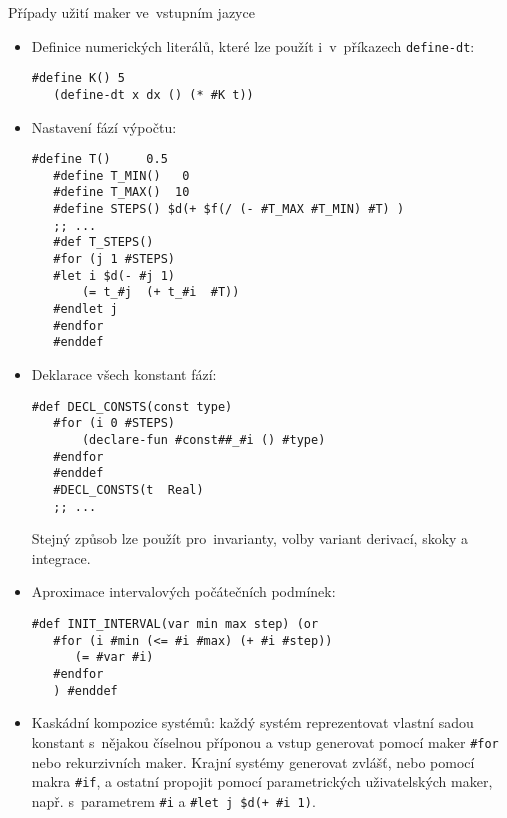 \documentclass[thesis=M,czech]{FITthesis}[2012/06/26]
\newcommand{\id}[1]{\texttt{#1}}
\begin{document}
\begin{section}{Případy užití maker ve~vstupním jazyce}
\label{s:macros:use_cases}
\begin{itemize}
\item Definice numerických literálů,
   které lze použít i~v~příkazech \id{define\--dt}:
   \begin{Verbatim}[samepage=true]
   #define K() 5
   (define-dt x dx () (* #K t))
   \end{Verbatim}
\item Nastavení fází výpočtu:
   \begin{Verbatim}[samepage=true]
   #define T()     0.5
   #define T_MIN()   0
   #define T_MAX()  10
   #define STEPS() $d(+ $f(/ (- #T_MAX #T_MIN) #T) )
   ;; ...
   #def T_STEPS()
   #for (j 1 #STEPS)
   #let i $d(- #j 1)
       (= t_#j  (+ t_#i  #T))
   #endlet j
   #endfor
   #enddef
   \end{Verbatim}
\item Deklarace všech konstant fází:
   \begin{Verbatim}[samepage=true]
   #def DECL_CONSTS(const type)
   #for (i 0 #STEPS)
       (declare-fun #const##_#i () #type)
   #endfor
   #enddef
   #DECL_CONSTS(t  Real)
   ;; ...
   \end{Verbatim}
   Stejný způsob lze použít pro~invarianty,
   volby variant derivací, skoky a integrace.
\item Aproximace intervalových počátečních podmínek:
   \begin{Verbatim}[samepage=true]
   #def INIT_INTERVAL(var min max step) (or
   #for (i #min (<= #i #max) (+ #i #step))
      (= #var #i)
   #endfor
   ) #enddef
   \end{Verbatim}
\item Kaskádní kompozice systémů:
   každý systém reprezentovat vlastní sadou konstant
   s~nějakou číselnou příponou
   a vstup generovat pomocí maker \id{\#for}
   nebo rekurzivních maker.
   Krajní systémy generovat zvlášť,
   nebo pomocí makra \id{\#if},
   a ostatní propojit pomocí parametrických uživatelských maker,
   např. s~parametrem \id{\#i} a \id{\#let j \$d(+ \#i 1)}.
\end{itemize}
\end{section} %



\end{document}
